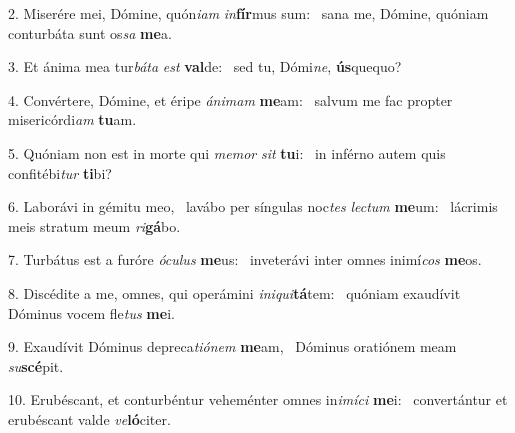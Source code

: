 2. Miserére mei, Dómine, quón\textit{i}\textit{am} \textit{in}\textbf{fír}mus sum: \ast\  sana me, Dómine, quóniam conturbáta sunt os\textit{sa} \textbf{me}a.\

3. Et ánima mea tur\textit{bá}\textit{ta} \textit{est} \textbf{val}de: \ast\  sed tu, Dómi\textit{ne}, \textbf{ús}quequo?\

4. Convértere, Dómine, et éripe \textit{á}\textit{ni}\textit{mam} \textbf{me}am: \ast\  salvum me fac propter misericórdi\textit{am} \textbf{tu}am.\

5. Quóniam non est in morte qui \textit{me}\textit{mor} \textit{sit} \textbf{tu}i: \ast\  in inférno autem quis confitébi\textit{tur} \textbf{ti}bi?\

6. Laborávi in gémitu meo, \dag\  lavábo per síngulas noc\textit{tes} \textit{lec}\textit{tum} \textbf{me}um: \ast\  lácrimis meis stratum meum \textit{ri}\textbf{gá}bo.\

7. Turbátus est a furóre \textit{ó}\textit{cu}\textit{lus} \textbf{me}us: \ast\  inveterávi inter omnes inimí\textit{cos} \textbf{me}os.\

8. Discédite a me, omnes, qui operámini \textit{in}\textit{i}\textit{qui}\textbf{tá}tem: \ast\  quóniam exaudívit Dóminus vocem fle\textit{tus} \textbf{me}i.\

9. Exaudívit Dóminus depreca\textit{ti}\textit{ó}\textit{nem} \textbf{me}am, \ast\  Dóminus oratiónem meam \textit{su}\textbf{scé}pit.\

10. Erubéscant, et conturbéntur veheménter omnes in\textit{i}\textit{mí}\textit{ci} \textbf{me}i: \ast\  convertántur et erubéscant valde \textit{ve}\textbf{ló}citer.\

